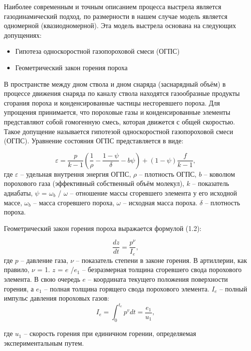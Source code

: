 \documentclass[14pt, a4paper]{extreport} %
\begin{document}
Наиболее современным и точным описанием процесса выстрела является газодинамический подход, 
по размерности в нашем случае модель является одномерной (квазиодномерной). Эта модель выстрела основана на следующих допущениях: 
\begin{itemize}
    \item Гипотеза односкоростной газопороховой смеси (ОГПС)
    \item Геометрический закон горения пороха
\end{itemize}


    В пространстве между дном ствола и дном снаряда (заснарядный объём) в процессе движения снаряда 
по каналу ствола находятся газообразные продукты сгорания пороха и конденсированные частицы несгоревшего пороха.
Для упрощения принимается, что пороховые газы и конденсированные элементы представляют собой гомогенную смесь, которая движется 
с общей скоростью. Такое допущение называется гипотезой односкоростной газопороховой смеси (ОГПС). Уравнение состояния ОГПС представляется в виде: 

\begin{equation}
\varepsilon = \frac{p}{k - 1} \left( \frac{1}{\rho} - \frac{1 - \psi}{\delta} - b \psi \right) + (1 - \psi) \frac{f}{k - 1},
\label{eq:epsilon}
\end{equation}
где $\varepsilon$ -- удельная внутрення энергия ОГПС, $\rho$ -- плотность ОГПС, $b$ -- коволюм порохового газа (эффективный собственный объём молекул), $k$ -- показатель адиабаты, 
$\psi$ = $\omega_b$ / $\omega$ -- отношение массы сгоревшего элемента у его исходной массе, $\omega_b$ -- масса сгоревшего пороха, $\omega$ -- исходная масса пороха. $\delta$ -- плотность пороха. 

Геометрический закон горения пороха выражается формулой (1.2): 

\begin{equation}
\frac{dz}{dt} = \frac{p^\nu}{I_e}, 
\label{eq:1}
\end{equation}
где  $p$ -- давление газа, $\nu$ -- показатель степени
в законе горения. В артиллерии, как правило, $\nu$ = 1. $z$ = $e$ /$e_1$ -- безразмерная толщина сгоревшего свода порохового элемента. В свою очередь
$e$ -- координата текущего положения поверхности горения, а $e_1$ -- полная толщина горящего свода порохового элемента. $I_e$ -- полный импульс давления пороховых газов:
\[
I_e = \int_0^{t_e} p^v  dt = \frac{e_1}{u_1},
\]

где $u_1$ -- скорость горения при единичном горении, определяемая экспериментальным путем.
\end{document}
